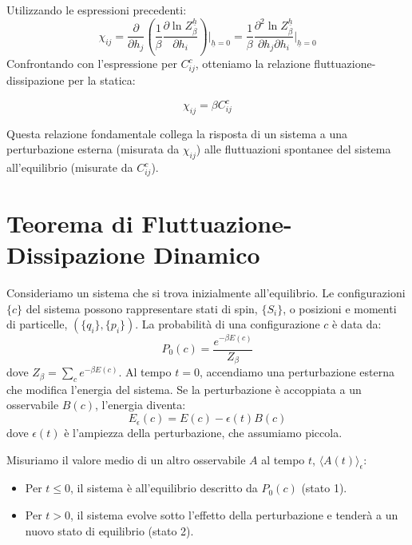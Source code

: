 Utilizzando le espressioni precedenti:
\begin{equation}
\chi_{ij} = \frac{\partial}{\partial h_j} \left( \frac{1}{\beta} \frac{\partial \ln Z_{\beta}^{\underline{h}}}{\partial h_i} \right) \bigg|_{\underline{h}=0} = \frac{1}{\beta} \frac{\partial^{2}\ln Z_{\beta}^{\underline{h}}}{\partial h_j \partial h_i}\bigg|_{\underline{h}=0}
\end{equation}
Confrontando con l'espressione per $C_{ij}^{c}$, otteniamo la relazione fluttuazione-dissipazione per la statica:

\begin{tcolorbox}[colback=colorA!5, colframe=colorA, arc=3mm, boxrule=1.2pt]
\begin{equation}
\chi_{ij}=\beta C_{ij}^{c}
\end{equation}
\end{tcolorbox}

Questa relazione fondamentale collega la risposta di un sistema a una perturbazione esterna (misurata da $\chi_{ij}$) alle fluttuazioni spontanee del sistema all'equilibrio (misurate da $C_{ij}^{c}$).

\section{Teorema di Fluttuazione-Dissipazione Dinamico}
Consideriamo un sistema che si trova inizialmente all'equilibrio.
Le configurazioni $\{c\}$ del sistema possono rappresentare stati di spin, $\{S_i\}$, o posizioni e momenti di particelle, $(\{q_i\}, \{p_i\})$.
La probabilità di una configurazione $c$ è data da:
\begin{equation} 
P_0(c) = \frac{e^{-\beta E(c)}}{Z_{\beta}}  
\end{equation}
dove $Z_{\beta} = \sum_c e^{-\beta E(c)}$.
Al tempo $t=0$, accendiamo una perturbazione esterna che modifica l'energia del sistema. Se la perturbazione è accoppiata a un osservabile $B(c)$, l'energia diventa:
\begin{equation}
E_{\epsilon}(c)=E(c)-\epsilon(t)B(c)
\end{equation}
dove $\epsilon(t)$ è l'ampiezza della perturbazione, che assumiamo piccola.

Misuriamo il valore medio di un altro osservabile $A$ al tempo $t$, $\langle A(t) \rangle_{\epsilon}$:
\begin{itemize}
    \item Per $t \le 0$, il sistema è all'equilibrio descritto da $P_0(c)$ (stato 1).
    \item Per $t>0$, il sistema evolve sotto l'effetto della perturbazione e tenderà a un nuovo stato di equilibrio (stato 2).
\end{itemize}

